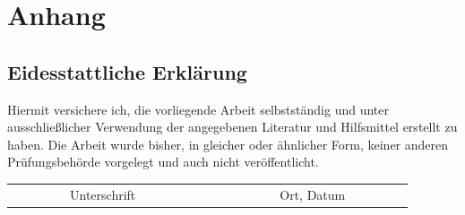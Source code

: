 \documentclass[a4paper,11pt,singlespacing]{article}
\begin{document}
\section*{Anhang}\label{Anhang}
\newpage


\begin{newpage}
\vspace*{\fill}
\section*{Eidesstattliche Erklärung}\label{sec:Eidesstattliche Erklärung}
	Hiermit versichere ich, die vorliegende Arbeit selbstständig und unter ausschlie{\ss}licher Verwendung der angegebenen Literatur und Hilfsmittel erstellt zu haben. Die Arbeit wurde bisher, in gleicher oder ähnlicher Form, keiner anderen Prüfungsbehörde vorgelegt und auch nicht veröffentlicht.\\

\vspace{3cm}
\begin{tabular*}{\textwidth}{c@{\extracolsep\fill}cc}
\cline{1-1}
\cline{3-3}
\\
\ \ \ \ \ \ \ \ \ Unterschrift\ \ \ \ \ \ \ \ \ \ & & \ \ \ \ \ \ \ \ \ Ort, Datum\ \ \ \ \ \ \ \ \ \\
\end{tabular*}
\end{newpage}
\end{document}
